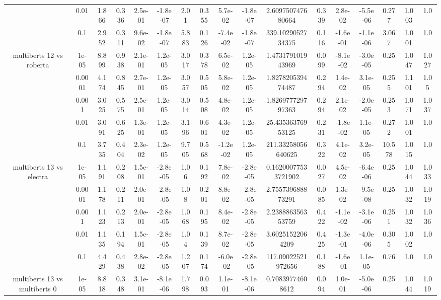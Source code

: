 \begin{tabular}{|c|c|c|c|c|c|c|c|c|c|c|c|c|c|c|c|c|}
 & 0.01 & 1.866 & 0.336 & 2.5e-01 & -1.8e-07 & 2.01 & 0.355 & 5.7e-02 & -1.8e-07 & 2.609750747680664 & 0.339 & 2.8e-02 & -5.5e-06 & 0.277 & 1.003 & 1.0 \\
 & 0.1 & 2.952 & 0.311 & 9.6e-02 & -1.8e-07 & 5.883 & 0.126 & -7.4e-02 & -1.8e-07 & 339.1029052734375 & 0.116 & -1.6e-01 & -1.1e-06 & 3.067 & 1.001 & 1.0 \\
\hline
\multirow{5}{*}{multiberts 12 vs roberta } & 1e-05 & 8.899 & 0.938 & 2.1e-01 & 1.2e-05 & 3.017 & 0.378 & 6.5e-02 & 1.2e-05 & 1.473179101943969 & 0.099 & -8.1e-02 & -3.0e-05 & 0.25 & 1.047 & 1.027 \\
 & 0.0001 & 4.174 & 0.845 & 2.7e-01 & 1.2e-05 & 3.057 & 0.505 & 5.8e-02 & 1.2e-05 & 1.827820539474487 & 0.294 & 1.4e-02 & 3.1e-05 & 0.255 & 1.101 & 1.05 \\
 & 0.001 & 3.025 & 0.575 & 2.5e-01 & 1.2e-05 & 3.014 & 0.508 & 4.8e-02 & 1.2e-05 & 1.826977729797363 & 0.294 & 2.1e-02 & -2.0e-05 & 0.253 & 1.071 & 1.037 \\
 & 0.01 & 3.091 & 0.625 & 1.3e-01 & 1.2e-05 & 3.196 & 0.601 & 4.3e-02 & 1.2e-05 & 25.43536376953125 & 0.231 & -1.8e-02 & 1.1e-05 & 0.272 & 1.001 & 1.0 \\
 & 0.1 & 3.735 & 0.404 & 2.3e-02 & 1.2e-05 & 9.705 & 0.568 & -1.2e-02 & 1.2e-05 & 211.33258056640625 & 0.322 & 4.1e-02 & 3.2e-05 & 10.578 & 1.015 & 1.0 \\
\hline
\multirow{5}{*}{multiberts 13 vs electra } & 1e-05 & 1.191 & 0.208 & 1.5e-01 & -2.8e-05 & 1.06 & 0.192 & 7.8e-02 & -2.8e-05 & 0.16200077533721902 & 0.027 & 4.5e-02 & -6.4e-06 & 0.25 & 1.044 & 1.033 \\
 & 0.0001 & 1.178 & 0.211 & 2.0e-01 & -2.8e-05 & 1.08 & 0.201 & 8.8e-02 & -2.8e-05 & 2.755739688873291 & 0.085 & 1.3e-02 & -9.5e-08 & 0.25 & 1.032 & 1.019 \\
 & 0.001 & 1.123 & 0.213 & 2.0e-01 & -2.8e-05 & 1.068 & 0.195 & 8.4e-02 & -2.8e-05 & 2.238886356353759 & 0.422 & -1.1e-02 & -3.1e-06 & 0.251 & 1.032 & 1.036 \\
 & 0.01 & 1.135 & 0.194 & 1.5e-01 & -2.8e-05 & 1.04 & 0.139 & 8.7e-02 & -2.8e-05 & 3.60251522064209 & 0.425 & -1.3e-01 & -4.0e-06 & 0.305 & 1.002 & 1.0 \\
 & 0.1 & 4.429 & 0.438 & 2.8e-02 & -2.8e-05 & 1.207 & 0.174 & -6.0e-02 & -2.8e-05 & 117.09022521972656 & 0.188 & -1.6e-01 & 1.1e-05 & 0.76 & 1.0 & 1.0 \\
\hline
\multirow{5}{*}{multiberts 13 vs multiberts 0} & 1e-05 & 8.818 & 0.348 & 3.1e-01 & -8.1e-06 & 1.798 & 0.093 & 1.1e-01 & -8.1e-06 & 0.70839774608612 & 0.094 & 1.0e-01 & -5.0e-06 & 0.25 & 1.044 & 1.019 \\

\end{tabular}

